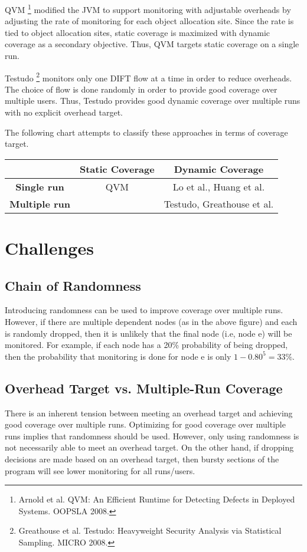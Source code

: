 \documentclass[11pt, letterpaper]{article}
\providecommand{\dotgraph}[2]{
    \vspace{-0.6in}
    \begin{center}
    \digraph[scale=0.75]{#1}{#2}
    \end{center}
    \vspace{-0.6in}
  }
\begin{document}
QVM \footnote{Arnold et al. QVM: An Efficient Runtime for Detecting Defects in
Deployed Systems. OOPSLA 2008.} modified the JVM to support monitoring with adjustable
overheads by adjusting the rate of monitoring for each object allocation site.
Since the rate is tied to object allocation sites, static coverage is maximized
with dynamic coverage as a secondary objective. Thus, QVM targets static
coverage on a single run.

Testudo \footnote{Greathouse et al. Testudo: Heavyweight Security Analysis via
Statistical Sampling. MICRO 2008.} monitors only one DIFT flow at a time in order to reduce
overheads. The choice of flow is done randomly in order to provide good
coverage over multiple users. Thus, Testudo provides good dynamic coverage over
multiple runs with no explicit overhead target.

The following chart attempts to classify these approaches in terms of coverage
target.
\begin{center}
\begin{tabular}{c|c|c|}
 & \textbf{Static Coverage} & \textbf{Dynamic Coverage} \\ \hline
\textbf{Single run} & QVM & Lo et al., Huang et al. \\ \hline
\textbf{Multiple run} & & Testudo, Greathouse et al. \\ \hline
\end{tabular}
\end{center}

\section{Challenges}
\subsection{Chain of Randomness}

\dotgraph{random_chain}{
  rankdir=LR; a->b; b->c; c->d; d->e;
}
Introducing randomness can be used to improve coverage over multiple runs.
However, if there are multiple dependent nodes (as in the above figure) and
each is randomly dropped, then it is unlikely that the final node (i.e, node e)
will be monitored. For example, if each node has a 20\% probability of being
dropped, then the probability that monitoring is done for node e is only
$1-0.80^5 = 33\%$.

\subsection{Overhead Target vs. Multiple-Run Coverage}
There is an inherent tension between meeting an overhead target and achieving
good coverage over multiple runs. Optimizing for good coverage over multiple
runs implies that randomness should be used. However, only using randomness is
not necessarily able to meet an overhead target. On the other hand, if dropping
decisions are made based on an overhead target, then bursty sections of the
program will see lower monitoring for all runs/users.
\end{document}
